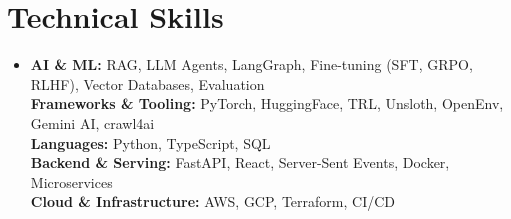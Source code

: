 \section{Technical Skills}
\begin{itemize}[leftmargin=0.18in, label={}, itemsep=1pt, parsep=0pt, topsep=2pt]
    \small\item
        \textbf{AI \& ML:} RAG, LLM Agents, LangGraph, Fine-tuning (SFT, GRPO, RLHF), Vector Databases, Evaluation \\
        \textbf{Frameworks \& Tooling:} PyTorch, HuggingFace, TRL, Unsloth, OpenEnv, Gemini AI, crawl4ai \\
        \textbf{Languages:} Python, TypeScript, SQL \\
        \textbf{Backend \& Serving:} FastAPI, React, Server-Sent Events, Docker, Microservices \\
        \textbf{Cloud \& Infrastructure:} AWS, GCP, Terraform, CI/CD
\end{itemize}
